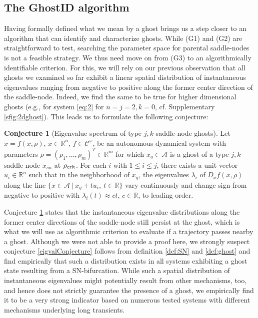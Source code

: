 \documentclass{article}
\theoremstyle{definition}
\newtheorem{conjecture}{Conjecture}[section]
\begin{document}
\begin{refsection}
\subsection{The GhostID algorithm}\label{subsec:algorithm}

Having formally defined what we mean by a ghost brings us a step closer to an algorithm that can identify and characterize ghosts. While (G1) and (G2) are straightforward to test, searching the parameter space for parental saddle-nodes is not a feasible strategy. We thus need move on from (G3) to an algorithmically identifiable criterion. For this, we will rely on our previous observation \cite{Koch_2024} that all ghosts we examined so far exhibit a linear spatial distribution of instantaneous eigenvalues ranging from negative to positive along the former center direction of the saddle-node. Indeed, we find the same to be true for higher dimensional ghosts (e.g., for system \ref{eq:2} for $n=j=2,k=0$, cf. Supplementary \autoref{sfig:2dghost}). This leads us to formulate the following conjecture:

\begin{conjecture}[Eigenvalue spectrum of type $j,k$ saddle-node ghosts]\label{eigvalConjecture}
Let $\dot{x} = f(x,\rho)$, $x\in \mathbb{R}^n$, $f\in \mathcal{C}^\omega$, be an autonomous dynamical system with parameters $\rho = (\rho_1,\dots,\rho_m)^T\in \mathbb{R}^m$ for which $x_g\in \mathcal{A}$ is a ghost of a type $j,k$ saddle-node $x_{sn}$ at $\rho_{\textnormal{crit}}$. For each $i$ with $1 \leq i \leq j$, there exists a unit vector $u_i\in \mathbb{R}^n$ such that in the neighborhood of $x_g$, the eigenvalues $\lambda_i$ of $D_xf(x,\rho)$ along the line $\{x\in \mathcal{A}\ |\ x_g+tu_i,\ t\in\mathbb{R}\}$ vary continuously and change sign from negative to positive with $\lambda_i(t)\approx ct$, $c\in\mathbb{R}$, to leading order.
\end{conjecture}

Conjecture \ref{eigvalConjecture} states that the instantaneous eigenvalue distributions along the former center directions of the saddle-node still persist at the ghost, which is what we will use as algorithmic criterion to evaluate if a trajectory passes nearby a ghost. Although we were not able to provide a proof here, we strongly suspect conjecture \autoref{eigvalConjecture} follows from definition \ref{def:SN} and \ref{def:ghost} and find empirically that such a distribution exists in all systems exhibiting a ghost state resulting from a SN-bifurcation. While such a spatial distribution of instantaneous eigenvalues might potentially result from other mechanisms, too, and hence does not strictly guarantee the presence of a ghost, we empirically find it to be a very strong indicator based on numerous tested systems with different mechanisms underlying long transients. 


\end{refsection}
\end{document}
